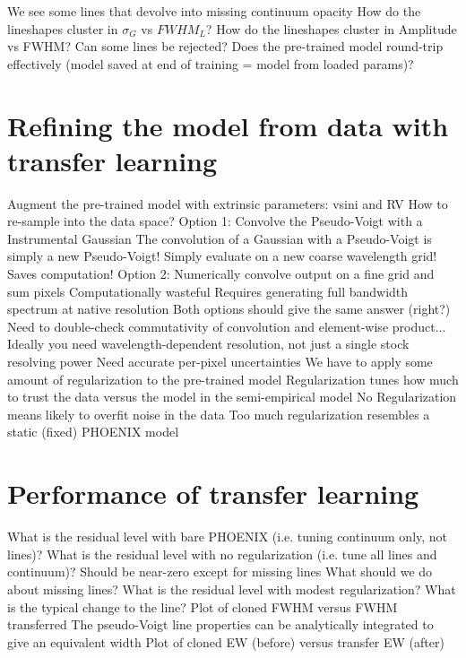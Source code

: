\documentclass[modern]{aastex631}
\begin{document}
\begin{outline}
 \1 We see some lines that devolve into missing continuum opacity
 \1 How do the lineshapes cluster in $\sigma_G$ vs $FWHM_L$?
 \1 How do the lineshapes cluster in Amplitude vs FWHM? Can some lines be rejected?
 \1 Does the pre-trained model round-trip effectively (model saved at end of training = model from loaded params)?
\end{outline}


\section{Refining the model from data with transfer learning}
\begin{outline}
 \1 Augment the pre-trained model with extrinsic parameters:
 \2 vsini and RV
 \1 How to re-sample into the data space?
 \1 Option 1: Convolve the Pseudo-Voigt with a Instrumental Gaussian
 \2 The convolution of a Gaussian with a Pseudo-Voigt is simply a new Pseudo-Voigt!
 \2 Simply evaluate on a new coarse wavelength grid! Saves computation!
 \1 Option 2: Numerically convolve output on a fine grid and sum pixels
 \2 Computationally wasteful
 \2 Requires generating full bandwidth spectrum at native resolution
 \1 Both options should give the same answer (right?)
 \2 Need to double-check commutativity of convolution and element-wise product...
 \1 Ideally you need wavelength-dependent resolution, not just a single stock resolving power
 \1 Need accurate per-pixel uncertainties
 \1 We have to apply some amount of regularization to the pre-trained model
 \2 Regularization tunes how much to trust the data versus the model in the semi-empirical model
 \2 No Regularization means likely to overfit noise in the data
 \2 Too much regularization resembles a static (fixed) PHOENIX model
\end{outline}

\section{Performance of transfer learning}
\begin{outline}
 \1 What is the residual level with bare PHOENIX (i.e. tuning continuum only, not lines)?
 \1 What is the residual level with no regularization (i.e. tune all lines and continuum)?
 \2 Should be near-zero except for missing lines
 \2 What should we do about missing lines?
 \1 What is the residual level with modest regularization? What is the typical change to the line?
 \2 Plot of cloned FWHM versus FWHM transferred
 \2 The pseudo-Voigt line properties can be analytically integrated to give an equivalent width
 \2 Plot of cloned EW (before) versus transfer EW (after)
\end{outline}
\end{document}
